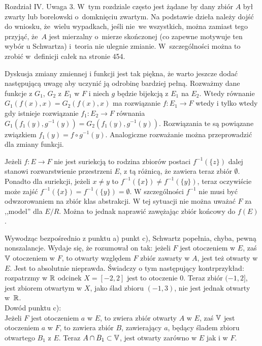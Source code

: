 \documentclass[a4paper,11pt]{article}
\newcommand{\V}{\mb{V}}
\begin{document}
\start Rozdział IV. Uwaga 3. W~tym rozdziale często jest żądane by
dany zbiór $A$ był zwarty lub borelowski o~domknięciu zwartym. Na
podstawie dzieła \cite{VBMTI} należy dojść do wniosku, że~wielu
wypadkach, jeśli nie~we wszystkich, można zamiast tego przyjąć, że~$A$
jest mierzalny o~mierze skończonej (co zapewne motywuje ten wybór u
Schwartza) i~teoria nie ulegnie zmianie. W~szczególności można to
zrobić w~definicji całek na stronie 454.

\vspace{\spaceFour}


\start {} Dyskusja zmiany zmiennej i funkcji jest tak piękna, że
warto jeszcze dodać następującą uwagę aby uczynić ją odrobinę bardziej
pełną. Rozważmy dane funkcje z $G_{ 1 }$, $G_{ 2 }$ z $E_{ 1 }$ w $F$
i niech $g$ będzie bijekcją z $E_{ 1 }$ na $E_{ 2 }$. Wtedy równanie
$G_{ 1 }( f( x ), x ) = G_{ 2 }( f( x ), x )$ ma rozwiązanie
$f : E_{ 1 } \to F$ wtedy i tylko wtedy gdy istnieje rozwiązanie
$f_{ 1 } : E_{ 2 } \to F$ równania
$G_{ 1 }( f_{ 1 }( y ), g^{ -1 }( y ) ) = G_{ 2 }( f_{ 1 }( y ), g^{
  -1 }( y ) )$. Rozwiązania te są powiązane związkiem
$f_{ 1 }( y ) = f \circ g^{ -1 }( y )$. Analogiczne rozważanie można
przeprowadzić dla zmiany funkcji.

\vspace{\spaceFour}


\start {} Jeżeli $f : E \to F$ nie jest suriekcją to rodzina
zbiorów postaci $f^{ -1 } ( \{ z\} )$ dalej stanowi rozwarstwienie
przestrzeni $E$, z tą różnicą, że zawiera teraz zbiór $\emptyset$.
Ponadto dla suriekcji, jeżeli $x \neq y$ to
$f^{ -1 }( \{ x \} ) \neq f^{ -1 } ( \{ y\} )$, teraz oczywiście może
zajść $f^{ -1 }( \{ x \} ) = f^{ -1 }( \{ y \} ) = \emptyset$. W
szczególności $f^{ -1 }$ nie musi być odwzorowaniem na zbiór klas
abstrakcji. W tej sytuacji nie można uważać $F$ za ,,model'' dla
$E / R$. Można to jednak naprawić zawężając zbiór końcowy do $f( E )$.

\vspace{\spaceFour}


\start {} Wywodząc bezpośrednio z punktu a) punkt c), Schwartz
popełnia, chyba, pewną nonszalancje. Wydaje się, że rozumował on tak:
jeżeli $F$ jest otoczeniem w $E$, zaś $\V$ otoczeniem w $F$, to
otwarty względem $F$ zbiór zawarty w $A$, jest też otwarty w $E$. Jest
to absolutnie nieprawda. Świadczy o tym następujący kontrprzykład:
rozpatrzmy w $\mathbb{R}$ odcinek $X = [ -2, 2 ]$ jest to otoczenie 0. Teraz
zbiór $( -1, 2 ]$, jest zbiorem otwartym
w $X$, jako ślad zbioru $( -1, 3 )$, nie jest jednak otwarty w~$\mathbb{R}$.\\
Dowód punktu c):\\
Jeżeli $F$ jest otoczeniem $a$ w $E$, to zwiera zbiór otwarty $A$ w
$E$, zaś $\V$ jest otoczeniem $a$ w $F$, to zawiera zbiór $B$,
zawierający $a$, będący śladem zbioru otwartego $B_{ 1 }$ z $E$. Teraz
$A \cap B_{ 1 } \subset \V$, jest otwarty zarówno w $E$ jak i w $F$.
\end{document}
